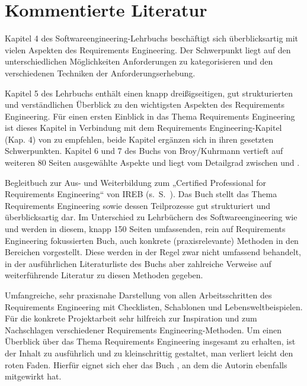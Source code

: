 \section{Kommentierte Literatur}
\label{sec:Kap-6.6}


{Kapitel 4 des Softwareengineering-Lehrbuchs beschäftigt sich überblicksartig mit vielen Aspekten des Requirements Engineering. Der Schwerpunkt liegt auf den unter\-schied\-lichen Möglichkeiten Anforderungen zu kategorisieren und den verschiedenen Techniken der Anforderungserhebung.}

{Kapitel 5 des Lehrbuchs enthält einen knapp dreißigseitigen, gut strukturierten und verständlichen Überblick zu den wichtigsten Aspekten des Requirements Engineering. Für einen ersten Einblick in das Thema Requirements Engineering ist dieses Kapitel in Verbindung mit dem Requirements Engineering-Kapitel (Kap. 4) von \cite{som18} zu empfehlen, beide Kapitel ergänzen sich in ihren gesetzten Schwerpunkten. Kapitel 6 und 7 des Buchs von Broy/Kuhrmann vertieft auf weiteren 80 Seiten ausgewählte Aspekte und liegt vom Detailgrad zwischen \cite{som18} und \cite{poh15}.}

{Begleitbuch zur Aus- und Weiterbildung zum „Certified Professional for Requirements Engineering“ von IREB (s.~S.~\pageref{sec:Kap-6:IREB}). Das Buch stellt das Thema Require\-ments Engineering sowie dessen Teilprozesse gut strukturiert und überblicksartig dar. Im Unterschied zu Lehrbüchern des Softwareengineering wie \cite{som18} und \cite{bro21} werden in diesem, knapp 150 Seiten umfassenden, rein auf Requirements Engineering fokussierten Buch, auch konkrete (praxisrelevante) Methoden in den Bereichen vorgestellt. Diese werden in der Regel zwar nicht umfassend behandelt, in der ausführ\-lichen Literaturliste des Buchs aber zahlreiche Verweise auf weiterführende \mbox{Literatur} zu diesen Methoden gegeben.}

{Umfangreiche, sehr praxisnahe Darstellung von allen Arbeitsschritten des Requirements Engineering mit Checklisten, Schablonen und Lebensweltbeispielen. Für die konkrete Projektarbeit sehr hilfreich zur Inspiration und zum Nachschlagen verschiedener Requirements Engineering-Methoden. Um einen Überblick über das Thema Requirements Engineering insgesamt zu erhalten, ist der Inhalt zu ausführlich und zu kleinschrittig gestaltet, man verliert leicht den roten Faden. Hierfür eignet sich eher das Buch \cite{poh15}, an dem die Autorin ebenfalls mitgewirkt hat.}

